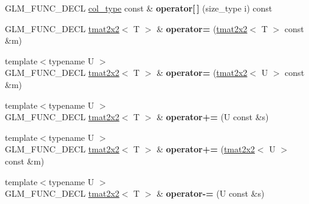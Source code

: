 \begin{DoxyCompactItemize}
\item 
\hypertarget{structglm_1_1detail_1_1tmat2x2_a074e61b27b42d0678fbb7edf85483edb}{}G\+L\+M\+\_\+\+F\+U\+N\+C\+\_\+\+D\+E\+C\+L \hyperlink{structglm_1_1detail_1_1tvec2}{col\+\_\+type} const \& {\bfseries operator\mbox{[}$\,$\mbox{]}} (size\+\_\+type i) const \label{structglm_1_1detail_1_1tmat2x2_a074e61b27b42d0678fbb7edf85483edb}

\item 
\hypertarget{structglm_1_1detail_1_1tmat2x2_a9df009dce8bbc63128b7c75f8f3a64f4}{}G\+L\+M\+\_\+\+F\+U\+N\+C\+\_\+\+D\+E\+C\+L \hyperlink{structglm_1_1detail_1_1tmat2x2}{tmat2x2}$<$ T $>$ \& {\bfseries operator=} (\hyperlink{structglm_1_1detail_1_1tmat2x2}{tmat2x2}$<$ T $>$ const \&m)\label{structglm_1_1detail_1_1tmat2x2_a9df009dce8bbc63128b7c75f8f3a64f4}

\item 
\hypertarget{structglm_1_1detail_1_1tmat2x2_a160e32c3fb95140823bf63efc757a635}{}{\footnotesize template$<$typename U $>$ }\\G\+L\+M\+\_\+\+F\+U\+N\+C\+\_\+\+D\+E\+C\+L \hyperlink{structglm_1_1detail_1_1tmat2x2}{tmat2x2}$<$ T $>$ \& {\bfseries operator=} (\hyperlink{structglm_1_1detail_1_1tmat2x2}{tmat2x2}$<$ U $>$ const \&m)\label{structglm_1_1detail_1_1tmat2x2_a160e32c3fb95140823bf63efc757a635}

\item 
\hypertarget{structglm_1_1detail_1_1tmat2x2_a1bcaf856c6b8eefbc44c2158101ce292}{}{\footnotesize template$<$typename U $>$ }\\G\+L\+M\+\_\+\+F\+U\+N\+C\+\_\+\+D\+E\+C\+L \hyperlink{structglm_1_1detail_1_1tmat2x2}{tmat2x2}$<$ T $>$ \& {\bfseries operator+=} (U const \&s)\label{structglm_1_1detail_1_1tmat2x2_a1bcaf856c6b8eefbc44c2158101ce292}

\item 
\hypertarget{structglm_1_1detail_1_1tmat2x2_a378a8fa1e71d81d423f619271751d3e4}{}{\footnotesize template$<$typename U $>$ }\\G\+L\+M\+\_\+\+F\+U\+N\+C\+\_\+\+D\+E\+C\+L \hyperlink{structglm_1_1detail_1_1tmat2x2}{tmat2x2}$<$ T $>$ \& {\bfseries operator+=} (\hyperlink{structglm_1_1detail_1_1tmat2x2}{tmat2x2}$<$ U $>$ const \&m)\label{structglm_1_1detail_1_1tmat2x2_a378a8fa1e71d81d423f619271751d3e4}

\item 
\hypertarget{structglm_1_1detail_1_1tmat2x2_af74e7c76c58ae2e2a59d0ff1db7fbe6e}{}{\footnotesize template$<$typename U $>$ }\\G\+L\+M\+\_\+\+F\+U\+N\+C\+\_\+\+D\+E\+C\+L \hyperlink{structglm_1_1detail_1_1tmat2x2}{tmat2x2}$<$ T $>$ \& {\bfseries operator-\/=} (U const \&s)\label{structglm_1_1detail_1_1tmat2x2_af74e7c76c58ae2e2a59d0ff1db7fbe6e}


\end{DoxyCompactItemize}
